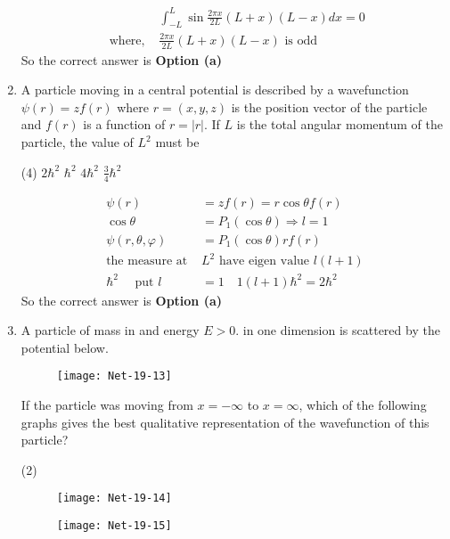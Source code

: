 \begin{enumerate}
\begin{answer}
\begin{align*}
	&\int_{-L}^{L} \sin \frac{2 \pi x}{2 L}(L+x)(L-x) d x=0\\
	\text { where, }& \frac{2 \pi x}{2 L}(L+x)(L-x) \text { is odd }
	\end{align*}
		So the correct answer is \textbf{Option (a)}
\end{answer}
\item  A particle moving in a central potential is described by a wavefunction $\psi(r)=z f(r)$ where $r=(x, y, z)$ is the position vector of the particle and $f(r)$ is a function of $r=|r|$.
If $L$ is the total angular momentum of the particle, the value of $L^{2}$ must be
 \begin{tasks}(4)
	\task[\textbf{a.}]$2 \hbar^{2}$
	\task[\textbf{b.}]$\hbar^{2}$
	\task[\textbf{c.}]$4 \hbar^{2}$
	\task[\textbf{d.}]$\frac{3}{4} \hbar^{2}$ 
\end{tasks}
\begin{answer}
	\begin{align*}
	 \psi(r)&=z f(r)=r \cos \theta f(r)\\
	\cos \theta&=P_{1}(\cos \theta) \Rightarrow l=1 \\
	\psi(r, \theta, \varphi)&=P_{1}(\cos \theta) r f(r)\\
	\text{the measure at }&\text{$L^{2}$ have eigen value $l(l+1)$}\\ \hbar^{2} \quad\text{ put }l&=1 \quad 1(l+1) \hbar^{2}=2 \hbar^{2}
	\end{align*}
	So the correct answer is \textbf{Option (a)}
\end{answer}
\item  A particle of mass in and energy $E>0$. in one dimension is scattered by the potential below.
\begin{figure}[H]
	\centering
	\texttt{[image: Net-19-13]}
\end{figure}
If the particle was moving from $x=-\infty$ to $x=\infty$, which of the following graphs gives the best qualitative representation of the wavefunction of this particle?
 \begin{tasks}(2)
	\task[\textbf{a.}]
	\begin{figure}[H]
		\centering
		\texttt{[image: Net-19-14]}
	\end{figure}
	\task[\textbf{b.}]
		\begin{figure}[H]
		\centering
		\texttt{[image: Net-19-15]}
	\end{figure}
	\task[\textbf{c.}]
		\begin{figure}[H]

\end{figure}
\end{tasks}
\end{enumerate}
